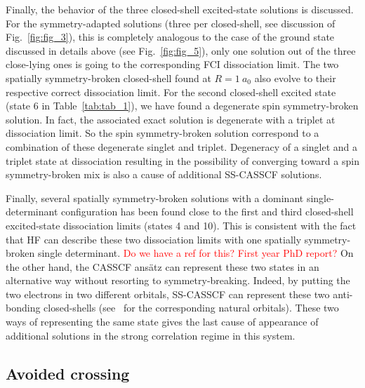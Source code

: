 \documentclass[aps,prb,reprint,showkeys,superscriptaddress]{revtex4-1}
\newcommand{\todo}[1]{\textcolor{red}{#1}}
\begin{document}
Finally, the behavior of the three closed-shell excited-state solutions is discussed.
For the symmetry-adapted solutions (three per closed-shell, see discussion of Fig.~\ref{fig:fig_3}), this is completely analogous to the case of the ground state discussed in details above (see Fig.~\ref{fig:fig_5}), \ie only one solution out of the three close-lying ones is going to the corresponding FCI dissociation limit.
The two spatially symmetry-broken closed-shell found at $R=1~a_0$ also evolve to their respective correct dissociation limit.
For the second closed-shell excited state (state 6 in Table~\ref{tab:tab_1}), we have found a degenerate spin symmetry-broken solution.
In fact, the associated exact solution is degenerate with a triplet at dissociation limit.
So the spin symmetry-broken solution correspond to a combination of these degenerate singlet and triplet.
Degeneracy of a singlet and a triplet state at dissociation resulting in the possibility of converging toward a spin symmetry-broken mix is also a cause of additional SS-CASSCF solutions.

Finally, several spatially symmetry-broken solutions with a dominant single-determinant configuration has been found close to the first and third closed-shell excited-state dissociation limits (states 4 and 10).
This is consistent with the fact that HF can describe these two dissociation limits with one spatially symmetry-broken single determinant. \todo{Do we have a ref for this? First year PhD report?}
On the other hand, the CASSCF ans\"atz can represent these two states in an alternative way without resorting to symmetry-breaking.
Indeed, by putting the two electrons in two different orbitals, SS-CASSCF can represent these two anti-bonding closed-shells (see \SupInf~for the corresponding natural orbitals).
These two ways of representing the same state gives the last cause of appearance of additional solutions in the strong correlation regime in this system.

\subsection{Avoided crossing}
\label{sec:avoided}
\end{document}
